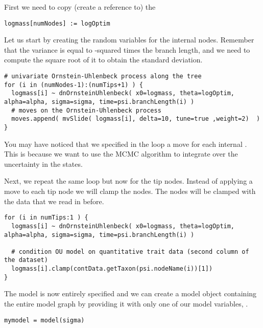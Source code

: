 First we need to copy (create a reference to) the 
{\tt \small \begin{snugshade*}
\begin{lstlisting}
logmass[numNodes] := logOptim
\end{lstlisting}
\end{snugshade*}}
Let us start by creating the random variables for the internal nodes. Remember that the variance is equal to -squared times the branch length, and we need to compute the square root of it to obtain the standard deviation.
{\tt \small \begin{snugshade*}
\begin{lstlisting}
# univariate Ornstein-Uhlenbeck process along the tree
for (i in (numNodes-1):(numTips+1) ) {
  logmass[i] ~ dnOrnsteinUhlenbeck( x0=logmass, theta=logOptim, alpha=alpha, sigma=sigma, time=psi.branchLength(i) )
  # moves on the Ornstein-Uhlenbeck process
  moves.append( mvSlide( logmass[i], delta=10, tune=true ,weight=2)  )
}
\end{lstlisting}
\end{snugshade*}}
You may have noticed that we specified in the loop a move for each internal . This is because we want to use the MCMC algorithm to integrate over the uncertainty in the states.

Next, we repeat the same loop but now for the tip nodes. Instead of applying a move to each tip node we will clamp the nodes. The nodes will be clamped with the data that we read in before.
{\tt \small \begin{snugshade*}
\begin{lstlisting}
for (i in numTips:1 ) {
  logmass[i] ~ dnOrnsteinUhlenbeck( x0=logmass, theta=logOptim, alpha=alpha, sigma=sigma, time=psi.branchLength(i) )

  # condition OU model on quantitative trait data (second column of the dataset)
  logmass[i].clamp(contData.getTaxon(psi.nodeName(i))[1])
}
\end{lstlisting}
\end{snugshade*}}

The model is now entirely specified and we can create a model object containing the entire model graph by providing it with only one of our model variables, \EG {}. 
{\tt \small \begin{snugshade*}
\begin{lstlisting}
mymodel = model(sigma)
\end{lstlisting}
\end{snugshade*}}


